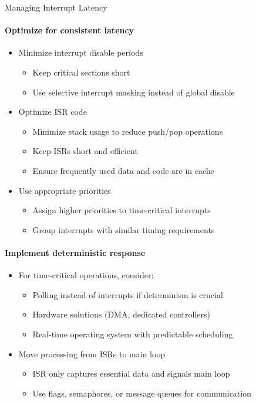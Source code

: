 \begin{KR}{Managing Interrupt Latency}
\paragraph{Optimize for consistent latency}
\begin{itemize}
    \item Minimize interrupt disable periods
    \begin{itemize}
        \item Keep critical sections short
        \item Use selective interrupt masking instead of global disable
    \end{itemize}
    \item Optimize ISR code
    \begin{itemize}
        \item Minimize stack usage to reduce push/pop operations
        \item Keep ISRs short and efficient
        \item Ensure frequently used data and code are in cache
    \end{itemize}
    \item Use appropriate priorities
    \begin{itemize}
        \item Assign higher priorities to time-critical interrupts
        \item Group interrupts with similar timing requirements
    \end{itemize}
\end{itemize}

\paragraph{Implement deterministic response}
\begin{itemize}
    \item For time-critical operations, consider:
    \begin{itemize}
        \item Polling instead of interrupts if determinism is crucial
        \item Hardware solutions (DMA, dedicated controllers)
        \item Real-time operating system with predictable scheduling
    \end{itemize}
    \item Move processing from ISRs to main loop
    \begin{itemize}
        \item ISR only captures essential data and signals main loop
        \item Use flags, semaphores, or message queues for communication
    \end{itemize}
\end{itemize}
\end{KR}

